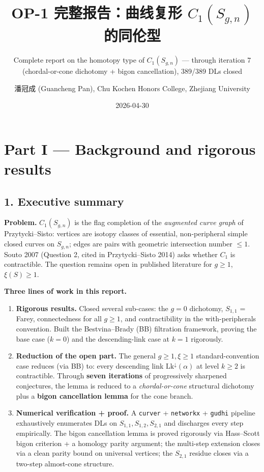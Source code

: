 \documentclass[
]{article}
\title{OP-1 完整报告：曲线复形 \(C_1(S_{g,n})\) 的同伦型}
\subtitle{Complete report on the homotopy type of \(C_1(S_{g,n})\) ---
through iteration 7 (chordal-or-cone dichotomy + bigon cancellation),
389/389 DLs closed}
\author{潘冠成 (Guancheng Pan), Chu Kochen Honors College, Zhejiang
University}
\date{2026-04-30}
\begin{document}
\maketitle

\section{Part I --- Background and rigorous
results}\label{part-i-background-and-rigorous-results}

\subsection{1. Executive summary}\label{executive-summary}

\textbf{Problem.} \(C_1(S_{g,n})\) is the flag completion of the
\emph{augmented curve graph} of Przytycki--Sisto: vertices are isotopy
classes of essential, non-peripheral simple closed curves on
\(S_{g,n}\); edges are pairs with geometric intersection number
\(\le 1\). Souto 2007 (Question 2, cited in Przytycki--Sisto 2014) asks
whether \(C_1\) is contractible. The question remains open in published
literature for \(g \ge 1\), \(\xi(S) \ge 1\).

\textbf{Three lines of work in this report.}

\begin{enumerate}
\def\labelenumi{\arabic{enumi}.}
\item
  \textbf{Rigorous results.} Closed several sub-cases: the \(g=0\)
  dichotomy, \(S_{1,1}\) = Farey, connectedness for all \(g\ge 1\), and
  contractibility in the with-peripherals convention. Built the
  Bestvina--Brady (BB) filtration framework, proving the base case
  (\(k=0\)) and the descending-link case at \(k=1\) rigorously.
\item
  \textbf{Reduction of the open part.} The general
  \(g \ge 1, \xi \ge 1\) standard-convention case reduces (via BB) to:
  every descending link \(\mathrm{Lk}^\downarrow(\alpha)\) at level
  \(k \ge 2\) is contractible. Through \textbf{seven iterations} of
  progressively sharpened conjectures, the lemma is reduced to a
  \emph{chordal-or-cone} structural dichotomy plus a \textbf{bigon
  cancellation lemma} for the cone branch.
\item
  \textbf{Numerical verification + proof.} A \texttt{curver} +
  \texttt{networkx} + \texttt{gudhi} pipeline exhaustively enumerates
  DLs on \(S_{1,1}, S_{1,2}, S_{2,1}\) and discharges every step
  empirically. The bigon cancellation lemma is proved rigorously via
  Hass--Scott bigon criterion + a homology parity argument; the
  multi-step extension closes via a clean parity bound on universal
  vertices; the \(S_{2,1}\) residue closes via a two-step almost-cone
  structure.
\end{enumerate}
\end{document}
